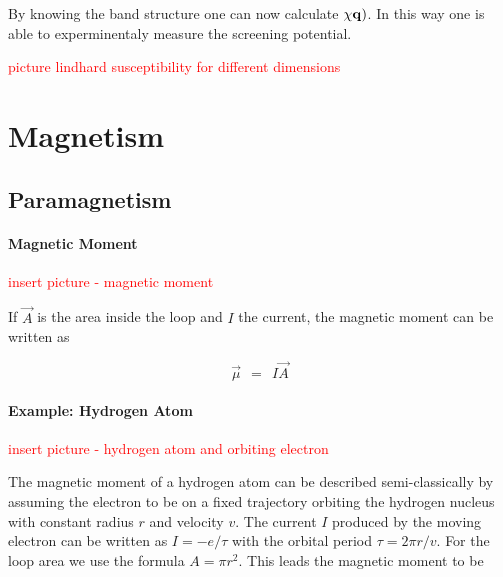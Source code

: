 \documentclass[10pt]{report}
\numberwithin{equation}{chapter}
\newcommand{\vc}[1]{ %
  \mathbf{#1}
}
\begin{document}
By knowing the band structure one can now calculate $\chi{\vc{q})}$. In this way one is able to experminentaly measure the screening potential.



\textcolor{red}{picture lindhard susceptibility for different dimensions}







\chapter{Magnetism}

\section{Paramagnetism}

\subsubsection{Magnetic Moment}

\textcolor{red}{insert picture - magnetic moment}

If $\vec{A}$ is the area inside the loop and $I$ the current, the magnetic moment can be written as

\begin{equation} \label{eq:mag_mom}
  \vec{\mu} ~~=~~ I \vec{A}
\end{equation}


\subsubsection{Example: Hydrogen Atom}

\textcolor{red}{insert picture - hydrogen atom and orbiting electron}

The magnetic moment of a hydrogen atom can be described semi-classically by assuming the electron to be on a fixed trajectory orbiting the hydrogen nucleus with constant radius $r$ and velocity $v$. The current $I$ produced by the moving electron can be written as $I = -e/\tau$ with the orbital period $\tau = 2\pi r/v$. For the loop area we use the formula $A= \pi r^2$. This leads the magnetic moment to be
\end{document}
